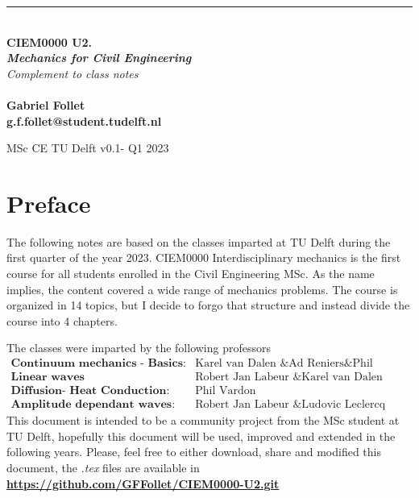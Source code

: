 \documentclass[a4paper, 11pt,article,oneside]{memoir}%
\begin{document}
\noindent
\setlength{\parindent}{0pt}

\begin{titlingpage}
	\raggedleft %
	{\color{magenta}\rule{3 pt}{\textheight}} %
	\hspace{0.05\textwidth} %
	\parbox[b]{0.9\textwidth}{ %
	
		{\\\Huge\bfseries{ CIEM0000 U2.\\
		\textit{Mechanics for Civil Engineering}}}\\[3\baselineskip]  %
		{\large\textit{Complement to class notes }}\\[4\baselineskip] %
      	\\[4\baselineskip] 
		{\color{magenta}\textbf{Gabriel Follet\\g.f.follet@student.tudelft.nl}}
		
		\vspace{0.25\textheight} %
			{\noindent MSc CE TU Delft  v0.1- Q1 2023}} %

\end{titlingpage}
\section*{Preface}
The following notes are based on the classes imparted at TU Delft during the first quarter of the year 2023.
CIEM0000 Interdisciplinary mechanics is the first course for all students enrolled in the Civil Engineering MSc.
 As the name implies, the content covered a wide range of mechanics problems. The course is organized in 14 topics, but I decide to forgo that structure and instead divide the course into 4 chapters.

The classes were imparted by the following professors
\begin{align*}
\textbf{Continuum mechanics - Basics: }&\text{Karel van Dalen \& Ad Reniers\&  Phil Vardon}\\
\textbf{Linear waves}&\text{Robert Jan Labeur \& Karel van Dalen}\\
\textbf{Diffusion- Heat Conduction: }&\text{Phil Vardon}\\
\textbf{Amplitude dependant waves: }&\text{Robert Jan Labeur \& Ludovic Leclercq}
\end{align*} 
This document is intended to be a community project from the MSc student at TU Delft, hopefully this document will be used, improved and extended in the following years. 
Please, feel free to either download, share and modified this document, the \textit{.tex} files are available  in \textbf{{\color{magenta}\href{https://github.com/GFFollet/CIEM0000-U2.git}{https://github.com/GFFollet/CIEM0000-U2.git}}}
\end{document}
